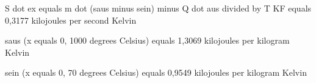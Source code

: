 S dot ex equals m dot (saus minus sein) minus Q dot aus divided by T KF equals 0,3177 kilojoules per second Kelvin

saus (x equals 0, 1000 degrees Celsius) equals 1,3069 kilojoules per kilogram Kelvin

sein (x equals 0, 70 degrees Celsius) equals 0,9549 kilojoules per kilogram Kelvin
